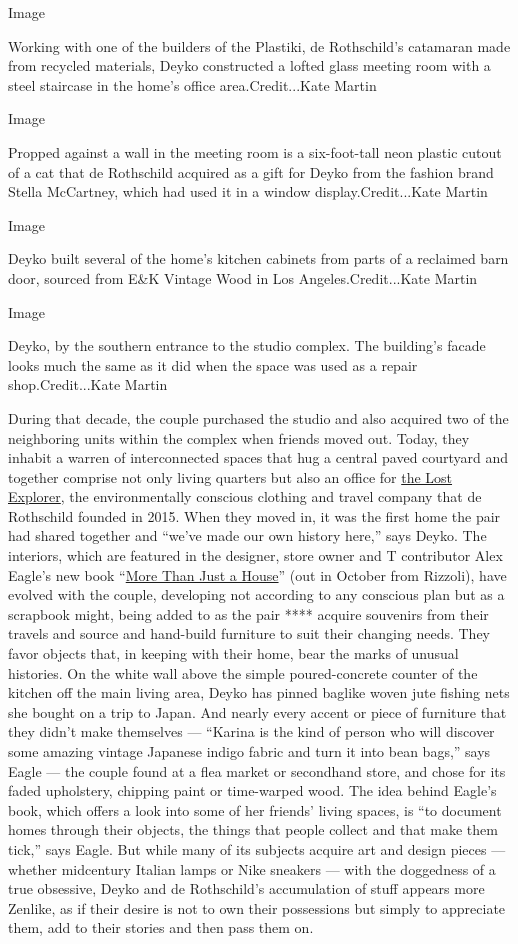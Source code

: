 Image

Working with one of the builders of the Plastiki, de Rothschild's
catamaran made from recycled materials, Deyko constructed a lofted glass
meeting room with a steel staircase in the home's office
area.Credit...Kate Martin

Image

Propped against a wall in the meeting room is a six-foot-tall neon
plastic cutout of a cat that de Rothschild acquired as a gift for Deyko
from the fashion brand Stella McCartney, which had used it in a window
display.Credit...Kate Martin

Image

Deyko built several of the home's kitchen cabinets from parts of a
reclaimed barn door, sourced from E\&K Vintage Wood in Los
Angeles.Credit...Kate Martin

Image

Deyko, by the southern entrance to the studio complex. The building's
facade looks much the same as it did when the space was used as a repair
shop.Credit...Kate Martin

During that decade, the couple purchased the studio and also acquired
two of the neighboring units within the complex when friends moved out.
Today, they inhabit a warren of interconnected spaces that hug a central
paved courtyard and together comprise not only living quarters but also
an office for \href{https://thelostexplorer.com/}{the Lost Explorer},
the environmentally conscious clothing and travel company that de
Rothschild founded in 2015. When they moved in, it was the first home
the pair had shared together and ``we've made our own history here,''
says Deyko. The interiors, which are featured in the designer, store
owner and T contributor Alex Eagle's new book
``\href{https://www.rizzoliusa.com/book/9780847867714}{More Than Just a
House}'' (out in October from Rizzoli), have evolved with the couple,
developing not according to any conscious plan but as a scrapbook might,
being added to as the pair **** acquire souvenirs from their travels and
source and hand-build furniture to suit their changing needs. They favor
objects that, in keeping with their home, bear the marks of unusual
histories. On the white wall above the simple poured-concrete counter of
the kitchen off the main living area, Deyko has pinned baglike woven
jute fishing nets she bought on a trip to Japan. And nearly every accent
or piece of furniture that they didn't make themselves --- ``Karina is
the kind of person who will discover some amazing vintage Japanese
indigo fabric and turn it into bean bags,'' says Eagle --- the couple
found at a flea market or secondhand store, and chose for its faded
upholstery, chipping paint or time-warped wood. The idea behind Eagle's
book, which offers a look into some of her friends' living spaces, is
``to document homes through their objects, the things that people
collect and that make them tick,'' says Eagle. But while many of its
subjects acquire art and design pieces --- whether midcentury Italian
lamps or Nike sneakers --- with the doggedness of a true obsessive,
Deyko and de Rothschild's accumulation of stuff appears more Zenlike, as
if their desire is not to own their possessions but simply to appreciate
them, add to their stories and then pass them on.

